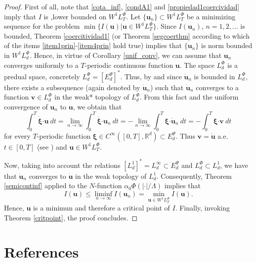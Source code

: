 \documentclass[twoside]{elsarticle}
\theoremstyle{remark}
\newcommand{\lphi}{L^{\Phi}}
\newcommand{\wphi}{W^{1}\lphi}
\renewcommand{\b}[1]{\boldsymbol{#1}}
\newcommand{\rr}{\mathbb{R}}
\newcommand{\ccdot}{\b{\cdot}}
\renewcommand{\leq}{\leqslant}
\newcommand{\epsi}{E^{\Psi}}
\begin{document}
\begin{proof} First of all, note that  \eqref{cota_inf}, \eqref{condA1} and \eqref{propiedad1coercividad} imply that $I$ is ,lower bounded on $\wphi_T$. Let $\{\b{u}_n\}\subset \wphi_T$ be a  minimizing sequence for the problem  $\min\{I(\b{u})|\b{u}\in\wphi_T\}$.
Since  $I(\b{u}_n)$, $n=1,2,\ldots$  is bounded, Theorem \ref{coercitividad1} (or Theorem \ref{segcoerthm} according to which of the items \ref{item1prin}-\ref{item4prin} hold true) implies that $\{\b{u}_n\}$ is norm bounded in $\wphi_d$. Hence, in virtue of Corollary \ref{unif_conv}, we can assume that $\b{u}_n$ converges uniformly to a $T$-periodic continuous function $\b{u}$.  The space  $\lphi_d$ is a predual space, concretely $\lphi_d=\left[\epsi_d\right]^*$. Thus, by \cite[Cor. 5, p. 148]{rao1991theory} and since $\b{\dot{u}}_n$ is bounded in $\lphi_d$,  there exists a subsequence (again denoted by $\b{\dot{u}}_n$) such that $\b{\dot{u}}_n$ converges to a function $\b{v}\in\lphi_d$ in the weak* topology of $\lphi_d$. From this fact and the uniform convergence of $\b{u}_n$ to $\b{u}$, we obtain that
\[
\int_0^T\b{\dot{\xi}}\ccdot\b{u}\ dt=\lim_{n\to\infty}\int_0^T\b{\dot{\xi}}\ccdot\b{u}_n \ dt=-\lim_{n\to\infty}\int_0^T\b{\xi}\ccdot\b{\dot{u}}_n\ dt=-\int_0^T\b{\xi}\ccdot\b{v}\ dt
\]
for every $T$-periodic function $\b{\xi}\in C^{\infty}([0,T],\rr^d)\subset\epsi_d$.
Thus $\b{v}=\b{\dot{u}}$ a.e. $t\in [0,T]$ (see \cite[p. 6]{mawhin2010critical}) and $\b{u}\in\wphi_T$.

Now, taking into account the relations $\left[L^1_d\right]^*=L^{\infty}_d\subset  \epsi_d$ and $\lphi_d\subset L^1_d$, we have that $\b{\dot{u}}_n$ converges to $\b{\dot{u}}$ in the weak topology of $L^1_d$. Consequently,  Theorem \ref{semicontinf} applied to the $N$-function $\alpha_0\Phi\left(|\ccdot|/\Lambda\right)$ implies that
\[I(\b{u})\leq  \liminf_{n\to\infty}I(\b{u}_n)=\min\limits_{\b{u}\in\wphi_T}I(\b{u}).\]
Hence, $\b{u}$ is a minimun and therefore a critical point of $I$. Finally, 
invoking Theorem \ref{critpoint},  the proof concludes.\end{proof}



\section*{References}
\end{document}
